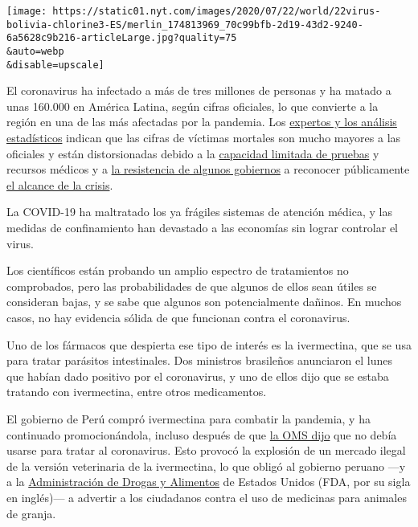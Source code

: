 \texttt{[image: https://static01.nyt.com/images/2020/07/22/world/22virus-bolivia-chlorine3-ES/merlin\_174813969\_70c99bfb-2d19-43d2-9240-6a5628c9b216-articleLarge.jpg?quality=75\\\&auto=webp\\\&disable=upscale]}

El coronavirus ha infectado a más de tres millones de personas y ha
matado a unas 160.000 en América Latina, según cifras oficiales, lo que
convierte a la región en una de las más afectadas por la pandemia. Los
\href{https://www.nytimes.com/interactive/2020/04/21/world/coronavirus-missing-deaths.html}{expertos
y los análisis estadísticos} indican que las cifras de víctimas mortales
son mucho mayores a las oficiales y están distorsionadas debido a la
\href{https://www.nytimes.com/es/2020/04/23/espanol/america-latina/virus-ecuador-muertes.html}{capacidad
limitada de pruebas} y recursos médicos y a
\href{https://www.nytimes.com/es/2020/05/08/espanol/america-latina/mexico-coronavirus.html}{la
resistencia de algunos gobiernos} a reconocer públicamente
\href{https://www.nytimes.com/es/2020/06/08/espanol/america-latina/brasil-cifras-coronavirus.html}{el
alcance de la crisis}.

La COVID-19 ha maltratado los ya frágiles sistemas de atención médica, y
las medidas de confinamiento han devastado a las economías sin lograr
controlar el virus.

Los científicos están probando un amplio espectro de tratamientos no
comprobados, pero las probabilidades de que algunos de ellos sean útiles
se consideran bajas, y se sabe que algunos son potencialmente dañinos.
En muchos casos, no hay evidencia sólida de que funcionan contra el
coronavirus.

Uno de los fármacos que despierta ese tipo de interés es la ivermectina,
que se usa para tratar parásitos intestinales. Dos ministros brasileños
anunciaron el lunes que habían dado positivo por el coronavirus, y uno
de ellos dijo que se estaba tratando con ivermectina, entre otros
medicamentos.

El gobierno de Perú compró ivermectina para combatir la pandemia, y ha
continuado promocionándola, incluso después de que
\href{https://www.paho.org/es/documentos/recomendacion-sobre-uso-ivermectina-tratamiento-covid-19}{la
OMS dijo} que no debía usarse para tratar al coronavirus. Esto provocó
la explosión de un mercado ilegal de la versión veterinaria de la
ivermectina, lo que obligó al gobierno peruano ---y a la
\href{https://www.fda.gov/animal-veterinary/product-safety-information/fda-letter-stakeholders-do-not-use-ivermectin-intended-animals-treatment-covid-19-humans}{Administración
de Drogas y Alimentos} de Estados Unidos (FDA, por su sigla en
inglés)--- a advertir a los ciudadanos contra el uso de medicinas para
animales de granja.


